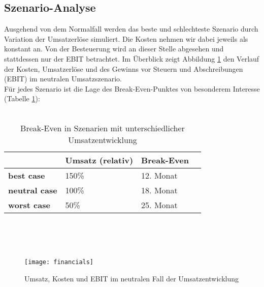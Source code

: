 \subsection{Szenario-Analyse}
Ausgehend von dem Normalfall werden das beste und schlechteste Szenario durch Variation der Umsatzerlöse simuliert. Die Kosten nehmen wir dabei jeweils als konstant an. Von der Besteuerung wird an dieser Stelle abgesehen und stattdessen nur der EBIT betrachtet. Im Überblick zeigt Abbildung \ref{fig:financials1} den Verlauf der Kosten, Umsatzerlöse und des Gewinns vor Steuern und Abschreibungen (EBIT) im neutralen Umsatzszenario. \\
Für jedes Szenario ist die Lage des Break-Even-Punktes von besonderem Interesse (Tabelle \ref{tab:break-even}):
\\
\\
\begin{table}[h!]
  \centering
    \begin{footnotesize}
  \begin{tabular}{|l|l|l|l|}\hline
  \textbf{ } &  \textbf{Umsatz (relativ)} &  \textbf{Break-Even} \\ \hline
 \textbf{best case} & 150\% & 12. Monat \\ \hline
\textbf{neutral case} & 100\% & 18. Monat \\ \hline
 \textbf{worst case} & 50\% & 25. Monat \\ \hline
  \end{tabular} 
    \end{footnotesize}
  \caption{Break-Even in Szenarien mit unterschiedlicher Umsatzentwicklung}
  \label{tab:break-even}
\end{table} 
\\
\\
\\
\begin{figure}[h!]
\centering
\texttt{[image: financials]}
\caption{Umsatz, Kosten und EBIT im neutralen Fall der Umsatzentwicklung}
\label{fig:financials1}
\end{figure}

